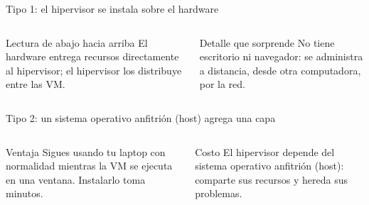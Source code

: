 \documentclass[aspectratio=169,10pt,c]{beamer}
\begin{document}
\begin{frame}{Tipo 1: el hipervisor se instala sobre el hardware}
\begin{center}
\end{center}
\begin{columns}[T,onlytextwidth]
\begin{block}{Lectura de abajo hacia arriba}
\small El hardware entrega recursos directamente al hipervisor; el hipervisor los distribuye entre las VM.
\end{block}
\begin{exampleblock}{Detalle que sorprende}
\small No tiene escritorio ni navegador: se administra a distancia, desde otra computadora, por la red.
\end{exampleblock}
\end{columns}
\end{frame}

\begin{frame}{Tipo 2: un sistema operativo anfitrión (host) agrega una capa}
\begin{center}
\end{center}
\begin{columns}[T,onlytextwidth]
\begin{block}{Ventaja}
\small Sigues usando tu laptop con normalidad mientras la VM se ejecuta en una ventana. Instalarlo toma minutos.
\end{block}
\begin{exampleblock}{Costo}
\small El hipervisor depende del sistema operativo anfitrión (host): comparte sus recursos y hereda sus problemas.
\end{exampleblock}
\end{columns}
\end{frame}
\end{document}
